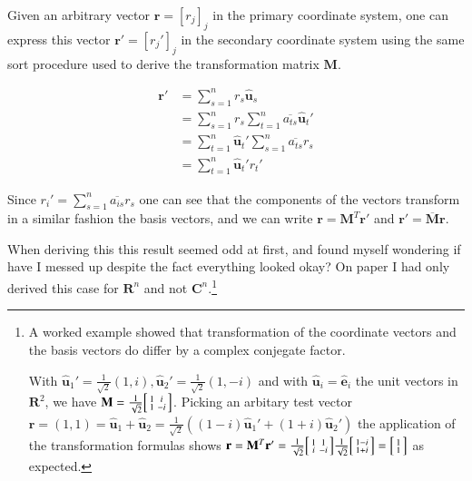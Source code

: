 \documentclass{article}      %
\newcommand{\Be}[0]{\mathbf{e}}
\newcommand{\Br}[0]{\mathbf{r}}
\newcommand{\Bu}[0]{\mathbf{u}}
\newcommand{\BM}[0]{\mathbf{M}}
\newcommand{\BR}[0]{\mathbf{R}}
\newcommand{\Cn}[0]{\mathbf{C}^n}
\newcommand{\Rn}[0]{\mathbf{R}^n}
\newcommand{\ecap}[0]{\hat{\Be}}
\newcommand{\ucap}[1]{\hat{\Bu}_{#1}}
\newcommand{\inv}[1]{\frac{1}{#1}}
\begin{document}
Given an arbitrary vector $\Br = [r_j]_j$ in the primary coordinate system, one
can express this vector $\Br' = [r_j']_j$ in the secondary coordinate system using
the same sort procedure used to derive the transformation matrix $\BM$.

\begin{align*}
\Br' &=
      \sum_{s=1}^n
      {
       r_s
       \ucap{s}
      } \\
      &=
      \sum_{s=1}^n
      {
       r_s
\sum_{t=1}^n
{
\overline{a_{ts}}
\ucap{t}'
}
      } \\
      &=
\sum_{t=1}^n
      {
\ucap{t}'
      \sum_{s=1}^n
{
\overline{a_{ts}}
       r_s
}
      } \\
      &=
\sum_{t=1}^n
      {
\ucap{t}'
r_t'
      }
\end{align*}

Since $r_i' =
      \sum_{s=1}^n
{
\overline{a_{is}}
       r_s
}
$
one can see that the components of the vectors transform
in a similar fashion the
basis vectors, and we can write $\Br = \BM^T \Br'$ and $\Br' = \overline{\BM} \Br$.

When deriving this this result seemed odd at first, and found myself wondering if have I messed up despite the fact everything looked okay?  On paper I had only derived this case for $\Rn$ and not $\Cn$.\footnote{
A worked example showed that transformation of the coordinate vectors and the basis vectors do differ by a complex conjegate factor.

With $\ucap{1}' = \inv{\sqrt{2}}(1,i), \ucap{2}'=\inv{\sqrt{2}}(1,-i)$ 
and with $\ucap{i} = \ecap_i$ the unit vectors in $\BR^2$, we have
$\BM =
\inv{\sqrt{2}}
\Bigl[
\begin{smallmatrix}
1 & i \\
1 & -i
\end{smallmatrix}
\Bigr]
$.  Picking an arbitary test vector
$\Br = (1,1) = \ucap{1} + \ucap{2} = \inv{\sqrt{2}}((1-i)\ucap{1}' + (1+i)\ucap{2}')$ the application of the
transformation formulas shows $\Br = \BM^T \Br' =
\inv{\sqrt{2}}
\Bigl[
\begin{smallmatrix}
1 & 1 \\
i & -i
\end{smallmatrix}
\Bigr]
\inv{\sqrt{2}}
\Bigl[
\begin{smallmatrix}
1 - i \\
1 + i
\end{smallmatrix}
\Bigr]
=
\Bigl[
\begin{smallmatrix}
1 \\
1
\end{smallmatrix}
\Bigr]
$ as expected.
}
\end{document}
